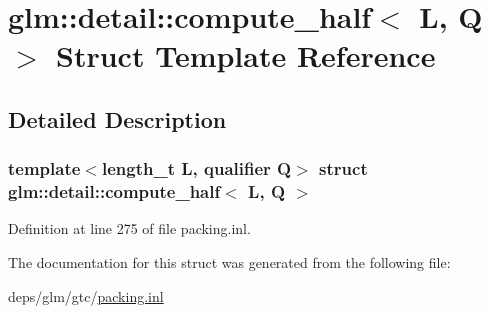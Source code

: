 \hypertarget{structglm_1_1detail_1_1compute__half}{}\section{glm\+:\+:detail\+:\+:compute\+\_\+half$<$ L, Q $>$ Struct Template Reference}
\label{structglm_1_1detail_1_1compute__half}


\subsection{Detailed Description}
\subsubsection*{template$<$length\+\_\+t L, qualifier Q$>$\newline
struct glm\+::detail\+::compute\+\_\+half$<$ L, Q $>$}



Definition at line 275 of file packing.\+inl.



The documentation for this struct was generated from the following file\+:\begin{DoxyCompactItemize}
\item 
deps/glm/gtc/\hyperlink{packing_8inl}{packing.\+inl}\end{DoxyCompactItemize}
